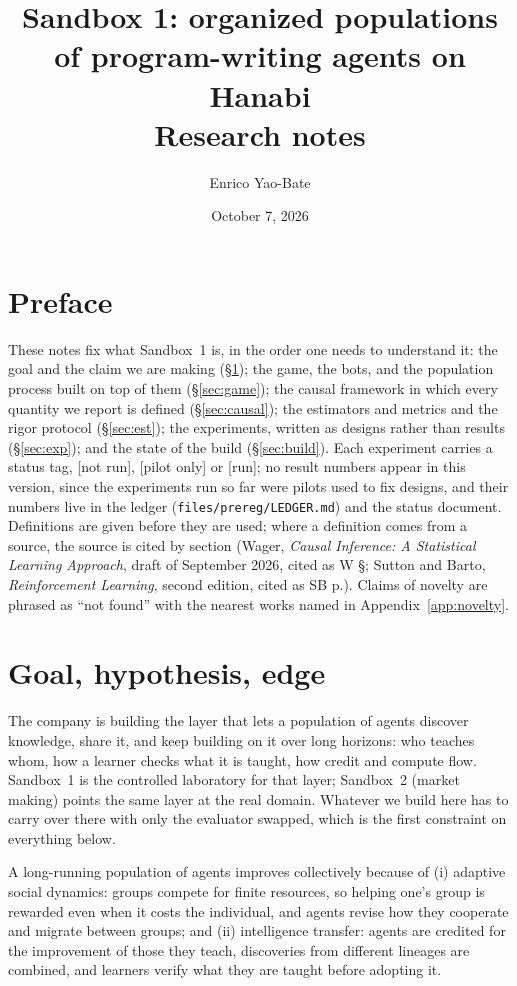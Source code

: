 \documentclass[11pt]{article}
\title{Sandbox 1: organized populations of program-writing agents on Hanabi\\[2pt]\large Research notes}
\author{Enrico Yao-Bate}
\date{October 7, 2026}
\numberwithin{theorem}{section}
\theoremstyle{definition}
\theoremstyle{problemstyle}
\begin{document}
\maketitle
\tableofcontents

\section*{Preface}
These notes fix what Sandbox~1 is, in the order one needs to understand it: the goal and the claim we are making
(\S\ref{sec:goal}); the game, the bots, and the population process built on top of them (\S\ref{sec:game}); the causal
framework in which every quantity we report is defined (\S\ref{sec:causal}); the estimators and metrics and the rigor
protocol (\S\ref{sec:est}); the experiments, written as designs rather than results (\S\ref{sec:exp}); and the state of
the build (\S\ref{sec:build}). Each experiment carries a status tag, [not run], [pilot only] or [run]; no result
numbers appear in this version, since the experiments run so far were pilots used to fix designs, and their numbers
live in the ledger (\texttt{files/prereg/LEDGER.md}) and the status document. Definitions are given before they are
used; where a definition comes from a source, the source is cited by section (Wager, \emph{Causal Inference: A
Statistical Learning Approach}, draft of September 2026, cited as W \S; Sutton and Barto, \emph{Reinforcement
Learning}, second edition, cited as SB p.). Claims of novelty are phrased as ``not found'' with the nearest works named
in Appendix~\ref{app:novelty}.

\section{Goal, hypothesis, edge}\label{sec:goal}

The company is building the layer that lets a population of agents discover knowledge, share it, and keep building on
it over long horizons: who teaches whom, how a learner checks what it is taught, how credit and compute flow. Sandbox~1
is the controlled laboratory for that layer; Sandbox~2 (market making) points the same layer at the real domain.
Whatever we build here has to carry over there with only the evaluator swapped, which is the first constraint on
everything below.

\begin{ass}\label{ass:thesis}
A long-running population of agents improves collectively because of (i) adaptive social dynamics: groups compete for
finite resources, so helping one's group is rewarded even when it costs the individual, and agents revise how they
cooperate and migrate between groups; and (ii) intelligence transfer: agents are credited for the improvement of those
they teach, discoveries from different lineages are combined, and learners verify what they are taught before adopting
it.
\end{ass}
\end{document}
